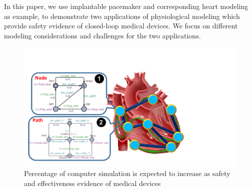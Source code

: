 In this paper, we use implantable pacemaker and corresponding heart modeling as example, to demonstrate two applications of physiological modeling which provide safety evidence of closed-loop medical devices.
We focus on different modeling considerations and challenges for the two applications.

\begin{figure}[t]
		\centering
		\includegraphics[width=\textwidth]{figs/Pacemaker.pdf}
		\caption{\small Percentage of computer simulation is expected to increase as safety and effectiveness evidence of medical devices}
		\label{fig:pacemaker}
\end{figure}
